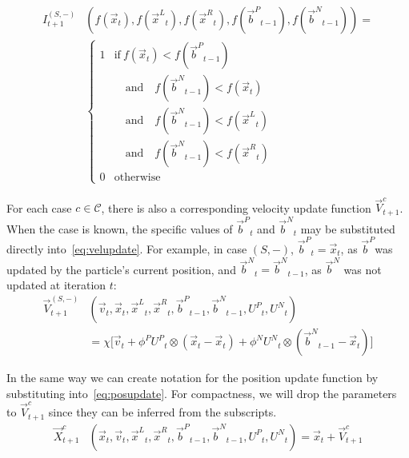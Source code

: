 \documentclass[ms]{byuprop}
\providecommand{\pers}{\ensuremath{P}}
\providecommand{\neigh}{\ensuremath{N}}
\providecommand{\leftind}{\ensuremath{L}}
\providecommand{\rightind}{\ensuremath{R}}
\providecommand{\nURand}{\ensuremath{U^\neigh}}
\providecommand{\pURand}{\ensuremath{U^\pers}}
\providecommand{\ppos}{\ensuremath{\Vec{x}}}
\providecommand{\pvel}{\ensuremath{\Vec{v}}}
\providecommand{\nbest}{\ensuremath{\Vec{b}^\neigh}}
\providecommand{\pbest}{\ensuremath{\Vec{b}^\pers}}
\providecommand{\constriction}{\ensuremath{\chi}}
\providecommand{\ncoeff}{\ensuremath{\phi^\neigh}}
\providecommand{\pcoeff}{\ensuremath{\phi^\pers}}
\providecommand{\ofunc}{\ensuremath{f}}
\providecommand{\indic}{\ensuremath{I}}
\providecommand{\specvel}{\ensuremath{\vec{V}}}
\providecommand{\specpos}{\ensuremath{\vec{X}}}
\providecommand{\leftn}{\ensuremath{\Vec{x}^\leftind}}
\providecommand{\rightn}{\ensuremath{\Vec{x}^\rightind}}
\providecommand{\caseset}{\ensuremath{\mathcal{C}}}
\providecommand{\casegen}{\ensuremath{c}}
\providecommand{\casexn}{\ensuremath{(S,-)}}
\begin{document}
\begin{align}
  \nonumber
	\indic_{t+1}^{\casexn} & (\ofunc ( \ppos_{t} ) ,\ofunc(\leftn_{t}),
	\ofunc(\rightn_{t}) ,\ofunc(\pbest_{t-1}) ,\ofunc(\nbest_{t-1}))= \\
  \label{eq:deficasexn}
	&\begin{cases}
	   1 & \text{if} \ \ofunc(\ppos_{t}) < \ofunc(\pbest_{t-1}) \\
	   &\quad \text{and} \quad \ofunc(\nbest_{t-1}) < \ofunc(\ppos_{t}) \\
	   &\quad \text{and} \quad \ofunc(\nbest_{t-1}) < \ofunc(\leftn_{t}) \\
	   &\quad \text{and} \quad \ofunc(\nbest_{t-1}) < \ofunc(\rightn_{t}) \\
	   0 & \text{otherwise}
	\end{cases}
\end{align}

For each case $\casegen \in \caseset$, there is also a corresponding
velocity update function $\specvel_{t+1}^{\casegen}$.  When the case is
known, the specific values of $\pbest_t$ and $\nbest_t$ may be substituted
directly into~\eqref{eq:velupdate}.  For example, in case $\casexn$,
$\pbest_{t}=\ppos_{t}$, as \pbest was updated by the particle's current
position, and $\nbest_{t}=\nbest_{t-1}$, as $\nbest$ was not updated at
iteration $t$:
\begin{align}
\nonumber
	\specvel_{t+1}^{\casexn} & (\pvel_t, \ppos_{t}, \leftn_{t}, \rightn_{t},
	\pbest_{t-1}, \nbest_{t-1}, \pURand_{t}, \nURand_{t}) \\
\label{eq:defvcasexn}
		&= \constriction \bigl[ \pvel_{t} +
			\pcoeff\pURand_{t}\otimes(\ppos_{t} - \ppos_{t})
			+ \ncoeff\nURand_{t}\otimes(\nbest_{t-1} -
			\ppos_{t}) \bigr]
\end{align}

In the same way we can create notation for the position update function by
substituting into~\eqref{eq:posupdate}.  For compactness, we will drop the
parameters to $\specvel_{t+1}^{\casegen}$ since they can be inferred from the
subscripts.
\begin{align}
\label{eq:defpcasegen}
	\specpos_{t+1}^{\casegen} & (\ppos_{t}, \pvel_{t}, \leftn_{t},
	\rightn_{t} ,\pbest_{t-1} ,\nbest_{t-1}, \pURand_{t}, \nURand_{t})
	= \ppos_{t} + \specvel_{t+1}^{\casegen}
\end{align}
\end{document}
